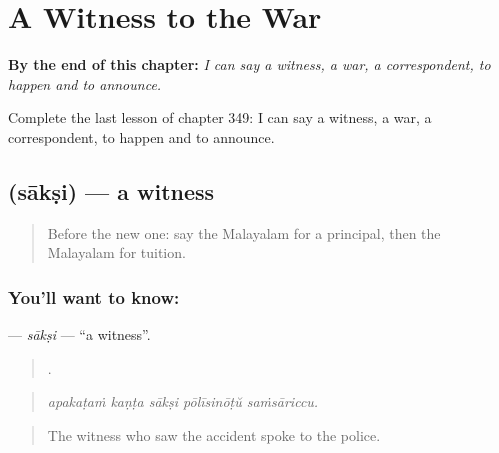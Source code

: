 
\chapter{A Witness to the War}
\label{ch:ml-a-witness-to-the-war}

\begin{chapteropening}
\textbf{By the end of this chapter:} \emph{I can say a witness, a war, a correspondent, to happen and to announce.}

Complete the last lesson of chapter 349: I can say a witness, a war, a correspondent, to happen and to announce.
\end{chapteropening}

\section[\texorpdfstring{\ml{സാക്ഷി} (sākṣi)}{സാക്ഷി (sākṣi)}]{ (sākṣi) — a witness}

\label{lesson:ML-C349-saksi}



\begin{quote}
Before the new one: say the Malayalam for a principal, then the Malayalam for tuition.
\end{quote}

\subsection*{You'll want to know: }
\textbf{} — \emph{sākṣi} — \textquotedblleft{}a witness\textquotedblright{}.

\begin{quote}
    .
\end{quote}

\begin{quote}
\emph{apakaṭaṁ kaṇṭa sākṣi pōlīsinōṭŭ saṁsāriccu.}
\end{quote}

\begin{quote}
The witness who saw the accident spoke to the police.
\end{quote}

